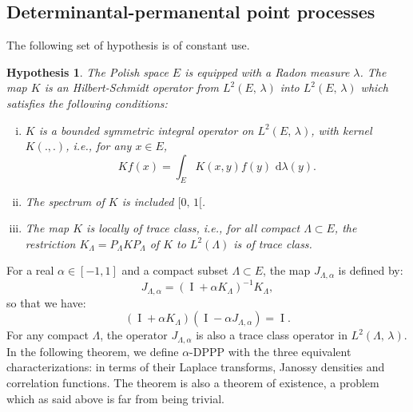 \documentclass[11pt,a4paper]{amsart}
\newtheorem{hyp}{Hypothesis}
\begin{document}
\subsection{Determinantal-permanental point processes}
\label{sec:alpha-dppp}
The following set of hypothesis is of constant use.
\begin{hyp}\label{hyp:condition_K} The Polish space $E$ is equipped
  with a Radon measure $\lambda$. The map $K$ is an Hilbert-Schmidt
  operator from $L^2(E,\, \lambda)$ into $L^2(E,\, \lambda)$ which
  satisfies the following conditions:
  \begin{enumerate}[i)]
  \item \label{item:1} $K$ is a bounded symmetric integral operator on
    $L^2(E,\, \lambda)$, with kernel $K(.,.)$, i.e., for any $x\in E$,
    \begin{equation*}
      K f(x)=\int_{E}{K(x,y)f(y){\text{ d}}\lambda(y)}.
    \end{equation*}
  \item \label{item:2} The spectrum of $K$ is included $[ 0,\, 1[$.
  \item \label{item:3} The map $K$ is locally of trace class, i.e.,
    for all compact $\Lambda\subset E$, the restriction
    $K_{\Lambda}=P_{\Lambda}K P_{\Lambda}$ of $K$ to $L^2(\Lambda)$ is
    of trace class. 
  \end{enumerate}
\end{hyp}
For a real $\alpha \in [-1,1]$ and a compact subset $\Lambda\subset
E$, the map $J_{\Lambda,\alpha}$ is defined by:
\begin{equation*}
  J_{\Lambda,\alpha} =\left({\operatorname{I}}+\alpha
    K_{\Lambda}\right)^{-1} K_{\Lambda},
\end{equation*}
so that we have:
\begin{equation*}
  \left({\operatorname{I}}+\alpha K_{\Lambda} \right) \left({\operatorname{I}}- \alpha
    J_{\Lambda,\alpha}\right) ={\operatorname{I}}.
\end{equation*}
For any compact $\Lambda$, the operator $J_{\Lambda,\alpha}$ is also a
trace class operator in $L^2(\Lambda,\, \lambda)$.  In the following
theorem, we define $\alpha$-DPPP with the three equivalent
characterizations: in terms of their Laplace transforms, Janossy
densities and correlation functions. The theorem is also a theorem of
existence, a problem which as said above is far from being trivial.
\end{document}

